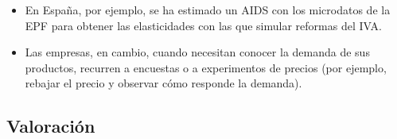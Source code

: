 \documentclass[11pt]{article}
\begin{document}
\begin{itemize}
\begin{itemize}
  \item la incidencia distributiva de los cambios de precios por tramos de renta;
  \item los índices de coste de la vida para cada tipo de hogar (\ref{sec:analisis-bienestar-consumidor});
  \item y las escalas de equivalencia y la medición de la pobreza y la desigualdad .
  \end{itemize}
\item En España, por ejemplo, se ha estimado un AIDS con los microdatos de la EPF para obtener las elasticidades con las que simular reformas del IVA\nocite{SanzRomero2012IVA}.
\item Las empresas, en cambio, cuando necesitan conocer la demanda de sus productos, recurren a encuestas o a experimentos de precios (por ejemplo, rebajar el precio y observar cómo responde la demanda).
\end{itemize}

\subsection{Valoración}\label{sec:valoracion}
\end{document}
